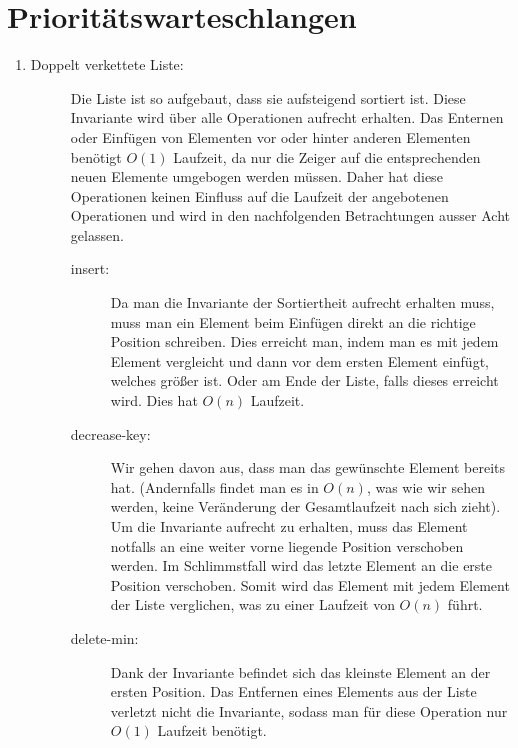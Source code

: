 \documentclass[a4paper,10pt]{article}
\begin{document}
\section{Prioritätswarteschlangen}
\begin{enumerate}
\item   \begin{description}
	\item[Doppelt verkettete Liste:] Die Liste ist so aufgebaut, dass sie aufsteigend sortiert ist. Diese Invariante wird über alle Operationen aufrecht erhalten. Das Enternen oder Einfügen von Elementen vor oder hinter anderen Elementen benötigt $O(1)$ Laufzeit, da nur die Zeiger auf die entsprechenden neuen Elemente umgebogen werden müssen. Daher hat diese Operationen keinen Einfluss auf die Laufzeit der angebotenen Operationen und wird in den nachfolgenden Betrachtungen ausser Acht gelassen.
	\begin{description}
		\item[insert:] Da man die Invariante der Sortiertheit aufrecht erhalten muss, muss man ein Element beim Einfügen direkt an die richtige Position schreiben. Dies erreicht man, indem man es mit jedem Element vergleicht und dann vor dem ersten Element einfügt, welches größer ist. Oder am Ende der Liste, falls dieses erreicht wird. Dies hat $O(n)$ Laufzeit.
		\item[decrease-key:] Wir gehen davon aus, dass man das gewünschte Element bereits hat. (Andernfalls findet man es in $O(n)$, was wie wir sehen werden, keine Veränderung der Gesamtlaufzeit nach sich zieht). Um die Invariante aufrecht zu erhalten, muss das Element notfalls an eine weiter vorne liegende Position verschoben werden. Im Schlimmstfall wird das letzte Element an die erste Position verschoben. Somit wird das Element mit jedem Element der Liste verglichen, was zu einer Laufzeit von $O(n)$ führt.
		\item[delete-min:] Dank der Invariante befindet sich das kleinste Element an der ersten Position. Das Entfernen eines Elements aus der Liste verletzt nicht die Invariante, sodass man für diese Operation nur $O(1)$ Laufzeit benötigt.
	\end{description}


\end{description}
\end{enumerate}
\end{document}
